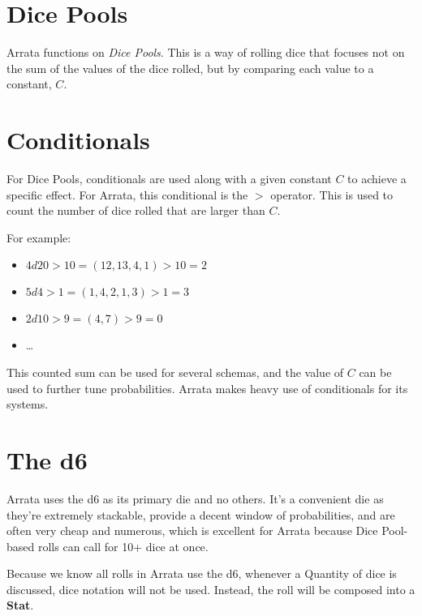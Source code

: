 \documentclass[../main.tex]{subfiles}
\begin{document}
    \section{Dice Pools}

    Arrata functions on {\em Dice Pools}. This is a way of rolling dice that focuses not on the sum of the values of the dice rolled, but by comparing each value to a constant, $C$.

    \section{Conditionals}

    For Dice Pools, conditionals are used along with a given constant $C$ to achieve a specific effect. For Arrata, this conditional is the $>$ operator. This is used to count the number of dice rolled that are larger than $C$.

    For example:

    \begin{itemize}
        \item $4d20>10 = (12, 13, 4, 1)>10 = 2$
        \item $5d4>1 = (1, 4, 2, 1, 3)>1 = 3$
        \item $2d10>9 = (4, 7)>9 = 0$
        \item \dots
    \end{itemize}

    This counted sum can be used for several schemas, and the value of $C$ can be used to further tune probabilities. Arrata makes heavy use of conditionals for its systems.

    \section{The d6}

    Arrata uses the d6 as its primary die and no others. It's a convenient die as they're extremely stackable, provide a decent window of probabilities, and are often very cheap and numerous, which is excellent for Arrata because Dice Pool-based rolls can call for 10+ dice at once.

    Because we know all rolls in Arrata use the d6, whenever a Quantity of dice is discussed, dice notation will not be used. Instead, the roll will be composed into a \textbf{Stat}.
\end{document}
